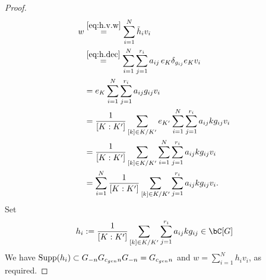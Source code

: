 \documentclass[12pt,a4paper]{amsart}%
\newcommand{\RamiB}[1]{{{#1}}}
\begin{document}
{{\begin{proof}
\begin{align*}
w&\overset{\eqref{eq:h.v.w}}{=}\sum_{i=1}^{N}\tilde h_iv_i\\
&\overset{\eqref{eq:h.dec}}{=}\sum_{i=1}^{N}\sum_{j=1}^{r_i} a_{ij}\,\RamiB{e_{K}}\delta_{g_{ij}}\RamiB{e_{K}}v_i\\
&={e_{K}}\sum_{i=1}^{N}\sum_{j=1}^{r_i} a_{ij}{g_{ij}}v_i\\
&=\frac{1}{[K:K']}\sum_{[k]\in K/K'}
{e_{K'}}\sum_{i=1}^{N}\sum_{j=1}^{r_i} a_{ij}k{g_{ij}}v_i\\
&=\frac{1}{[K:K']}\sum_{[k]\in K/K'}
\sum_{i=1}^{N}\sum_{j=1}^{r_i} a_{ij}k{g_{ij}}v_i\\
&=\sum_{i=1}^{N}\frac{1}{[K:K']}\sum_{[k]\in K/K'}
\sum_{j=1}^{r_i} a_{ij}k{g_{ij}}v_i
.
\end{align*}
Set
$$
h_i:=\frac{1}{[K:K']}\sum_{[k]\in K/K'}
\sum_{j=1}^{r_i} a_{ij}k{g_{ij}}
\in
\C[G]
$$
We have
$\operatorname{Supp}(h_{i})\subset 
G_{-n}
G_{c_{gen}n}
G_{-n}=G_{c_{gen}n}$
and 
$w=\sum_{i=1}^{N}h_iv_i$,
as required.
\end{proof}
}
}
\end{document}
